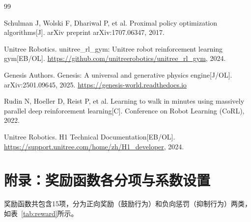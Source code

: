 \documentclass[12pt, a4paper]{article}
\begin{document}
\begin{thebibliography}{99}

Schulman J, Wolski F, Dhariwal P, et al.
Proximal policy optimization algorithms[J].
arXiv preprint arXiv:1707.06347, 2017.

Unitree Robotics.
unitree\_rl\_gym: Unitree robot reinforcement learning gym[EB/OL].
\url{https://github.com/unitreerobotics/unitree_rl_gym}, 2024.

Genesis Authors.
Genesis: A universal and generative physics engine[J/OL].
arXiv:2501.09645, 2025.
\url{https://genesis-world.readthedocs.io}

Rudin N, Hoeller D, Reist P, et al.
Learning to walk in minutes using massively parallel deep reinforcement learning[C].
Conference on Robot Learning (CoRL), 2022.

Unitree Robotics.
H1 Technical Documentation[EB/OL].
\url{https://support.unitree.com/home/zh/H1_developer}, 2024.

\end{thebibliography}

\newpage

\section*{附录：奖励函数各分项与系数设置}

奖励函数共包含15项，分为正向奖励（鼓励行为）和负向惩罚（抑制行为）两类，
如表~\ref{tab:reward}所示。
\end{document}
